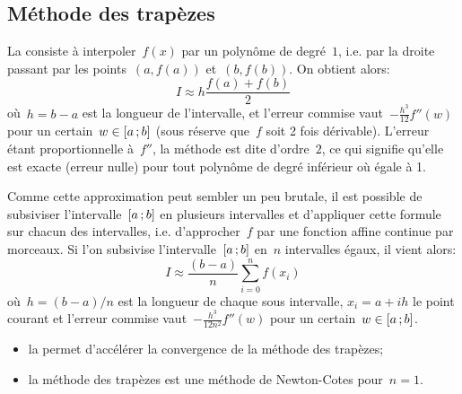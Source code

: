 \subsection{Méthode des trapèzes} 
La  consiste à interpoler~$f(x)$ par un polynôme de degré~$1$, i.e. par la droite passant par les points~$(a,f(a))$ et~$(b,f(b))$. On obtient alors: 
\begin{equation}
 I\approx h\dfrac{f(a)+f(b)}2
\end{equation}
où~$h=b-a$ est la longueur de l'intervalle, et l'erreur commise vaut~$-\frac{h^3}{12} f''(w)$ pour un certain~$w\in\mathopen{[}a\,;b\mathclose{]}$ (sous réserve que~$f$ soit 2 fois dérivable). L'erreur étant proportionnelle à~$f''$, la méthode est dite d'ordre~$2$, ce qui signifie qu'elle est exacte (erreur nulle) pour tout polynôme de degré inférieur où égale à 1. 

Comme cette approximation peut sembler un peu brutale, il est possible de subsiviser l'intervalle~$\mathopen{[}a\,;b\mathclose{]}$ en plusieurs intervalles et d'appliquer cette formule sur chacun des intervalles, i.e. d'approcher~$f$ par une fonction affine continue par morceaux. Si l'on subsivise l'intervalle~$\mathopen{[}a\,;b\mathclose{]}$ en~$n$ intervalles égaux, il vient alors: 
\begin{equation}
I\approx \frac{(b-a)}{n}\sum_{i=0}^{n}f(x_i)
\end{equation}
où~$h=(b-a)/n$ est la longueur de chaque sous intervalle, $x_i=a+ih$ le point courant et l'erreur commise vaut~$-\frac{h^3}{12n^2} f''(w)$ pour un certain~$w\in\mathopen{[}a\,;b\mathclose{]}$. 
\begin{remarque}[Remarques]\mbox{}
\begin{itemize}
\item la  permet d'accélérer la convergence de la méthode des trapèzes;
\item la méthode des trapèzes est une méthode de Newton-Cotes pour~$n=1$. 
\end{itemize}
\end{remarque} 
